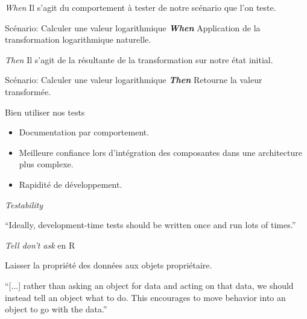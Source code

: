 \documentclass[11pt]{beamer}
\begin{document}
\begin{frame}{\textit{When}}
Il s'agit du comportement à tester de notre scénario que l'on teste.

\begin{block}{Scénario: Calculer une valeur logarithmique}
\textit{\textbf{When}} Application de la transformation logarithmique naturelle.
\end{block}
\end{frame}

\begin{frame}{\textit{Then}}
Il s'agit de la résultante de la transformation sur notre état initial.
\begin{block}{Scénario: Calculer une valeur logarithmique}
\textit{\textbf{Then}} Retourne la valeur transformée.
\end{block}
\end{frame}

\begin{frame}{Bien utiliser nos tests}
\begin{itemize}
\item Documentation par comportement.
\item Meilleure confiance lors d'intégration des composantes dans une architecture plus complexe.
\item Rapidité de développement.
\end{itemize}
\end{frame}

\begin{frame}{\textit{Testability}}
\begin{block}{}
{\large ``Ideally, development-time tests should be written once and run lots of times.''}
\vskip5mm
\hspace*{}
\end{block}
\end{frame}

\begin{frame}{\textit{Tell don't ask} en R}

Laisser la propriété des données aux objets propriétaire.

\begin{block}{}
{\large ``[...] rather than asking an object for data and acting on that data, we should instead tell an object what to do. This encourages to move behavior into an object to go with the data.''}
\vskip5mm
\hspace*{}
\end{block}
\end{frame}
\end{document}
